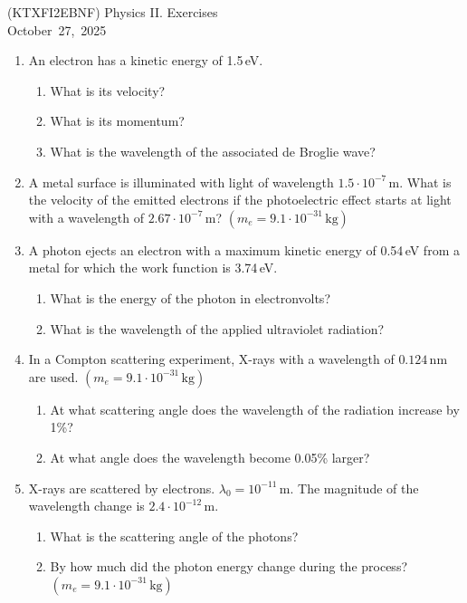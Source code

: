 \documentclass[a4paper,12pt]{letter}
\begin{document}
\begin{center}
 (KTXFI2EBNF) Physics II.  Exercises\\ \smallskip
October~27,~2025
 \end{center}


\begin{enumerate}
    \item An electron has a kinetic energy of 1.5\,eV.
    \begin{enumerate}
        \item What is its velocity?
        \item What is its momentum?
        \item What is the wavelength of the associated de Broglie wave?
    \end{enumerate}

    \item A metal surface is illuminated with light of wavelength $1.5 \cdot 10^{-7}\,\text{m}$.  What is the velocity of the emitted electrons if the photoelectric effect starts at light with a wavelength of $2.67 \cdot 10^{-7}\,\text{m}$?   $(m_e = 9.1 \cdot 10^{-31}\,\text{kg})$

    \item A photon ejects an electron with a maximum kinetic energy of 0.54\,eV from a metal for which the work function is 3.74\,eV.
    \begin{enumerate}
        \item What is the energy of the photon in electronvolts?
        \item What is the wavelength of the applied ultraviolet radiation?
    \end{enumerate}

    \item In a Compton scattering experiment, X-rays with a wavelength of $0.124\,\text{nm}$ are used. $(m_e = 9.1 \cdot 10^{-31}\,\text{kg})$
    \begin{enumerate}
        \item At what scattering angle does the wavelength of the radiation increase by 1\%?
        \item At what angle does the wavelength become 0.05\% larger?
    \end{enumerate}

    \item X-rays are scattered by electrons. $\lambda_0 = 10^{-11}\,\text{m}$. The magnitude of the wavelength change is $2.4 \cdot 10^{-12}\,\text{m}$.
    \begin{enumerate}
        \item What is the scattering angle of the photons?
        \item By how much did the photon energy change during the process? $(m_e = 9.1 \cdot 10^{-31}\,\text{kg})$
    \end{enumerate}

\end{enumerate}

\bigskip


\vfill
\end{document}
